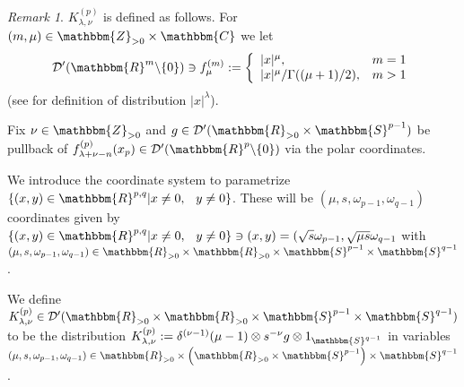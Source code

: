 \documentclass[12pt]{article}
\newcommand{\assign}{:=}
\theoremstyle{remark}
\newtheorem{remark}[proposition]{Remark}
\newcommand{\D}{\mathcal{D}}
\newcommand{\Sp}{\mathbbm{S}}
\newcommand{\R}{\mathbbm{R}}
\begin{document}
\begin{remark}
  $K^{(p)}_{\lambda, \nu}$ is defined as follows. For $(m, \mu) \in
  \mathbbm{Z}_{> 0} \times \mathbbm{C}$ we let
  \[ \mathcal{D}' (\mathbbm{R}^m \backslash \{ 0 \}) \ni f_{\mu}^{(m)} \assign
     \left\{ \begin{array}{ll}
       | x |^{\mu}, & m = 1\\
       | x |^{\mu} / \Gamma ((\mu + 1) / 2), & m > 1
     \end{array} \right. \]
  (see {\cite[ch. III, sec. 3.2, 3.3]{gelfand1980distribution}} for definition
  of distribution $| x |^{\lambda}$).
  
  Fix $\nu \in \mathbbm{Z}_{> 0}$ and $g \in \D' (\R_{> 0} \times \Sp^{p -
  1})$ be pullback of $f^{(p)}_{\lambda + \nu - n} (x_p) \in \mathcal{D}'
  (\mathbbm{R}^p \backslash \{ 0 \})$ via the polar coordinates.
  
  We introduce the coordinate system to parametrize $\{(x, y) \in \R^{p, q} |x
  \neq 0, \hspace{0.75em} y \neq 0\}$. These will be $(\mu, s, \omega_{p - 1},
  \omega_{q - 1})$ coordinates given by $\{ (x, y) \in \R^{p, q} |x \neq 0,
  \hspace{0.75em} y \neq 0\} \ni (x, y) = (\sqrt{s} \omega_{p - 1}, \sqrt{\mu
  s} \omega_{q - 1}$ with $(\mu, s, \omega_{p - 1}, \omega_{q - 1}) \in \R_{>
  0} \times \R_{> 0} \times \Sp^{p - 1} \times \Sp^{q - 1}$.
  
  We define $K^{(p)}_{\lambda, \nu} \in \D' (\R_{> 0} \times \R_{> 0} \times
  \Sp^{p - 1} \times \Sp^{q - 1})$ to be the distribution $K^{(p)}_{\lambda,
  \nu} \assign \delta^{(\nu - 1)}  (\mu - 1) \otimes s^{- \nu} g \otimes
  1_{\Sp^{q - 1}}$ in variables $(\mu, s, \omega_{p - 1}, \omega_{q - 1}) \in
  \R_{> 0} \times \left( \R_{> 0} \times \Sp^{p - 1} \right) \times \Sp^{q -
  1}$.
\end{remark}
\end{document}
